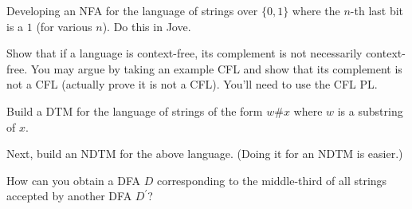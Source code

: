 \documentclass[12pt]{article}
\begin{document}
\begin{compactenum}
\item Developing an NFA for the language of strings over $\{0,1\}$
  where the $n$-th last bit is a $1$ (for various $n$). Do this in Jove.

\item Show that if a language is context-free, its complement is not
  necessarily context-free. You may argue by taking an example CFL
  and show that its complement is not a CFL (actually prove it is not
  a CFL). You'll need to use the CFL PL.

\item Build a DTM for the language of strings of the form
  $w\#x$ where $w$ is a substring of $x$.

\item Next, build an NDTM for the above language. (Doing it for an NDTM
  is easier.)

\item How can you obtain a DFA $D$ corresponding
to the middle-third of all strings accepted by another DFA $D^{'}$?
\end{compactenum}
\end{document}
